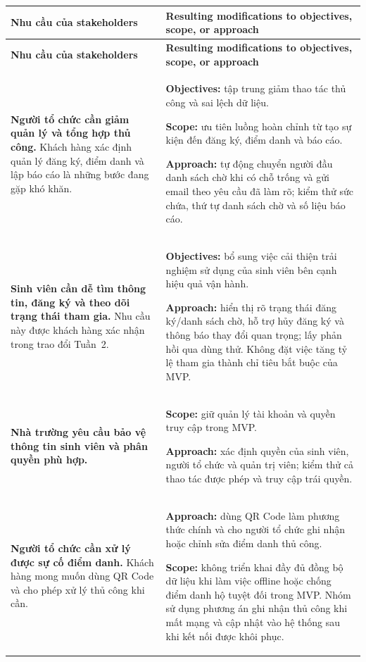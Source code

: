 \begingroup
\small
\setlength{\tabcolsep}{4pt}
\setlength{\parskip}{0pt}
\renewcommand{\arraystretch}{1.20}
\begin{longtable}{>{\RaggedRight\arraybackslash}p{}
                  >{\RaggedRight\arraybackslash}p{}}
\rowcolor{headerblue}
\color{white}\textbf{Nhu cầu của stakeholders} &
\color{white}\textbf{Resulting modifications to objectives, scope, or approach} \\
\endfirsthead

\rowcolor{headerblue}
\color{white}\textbf{Nhu cầu của stakeholders} &
\color{white}\textbf{Resulting modifications to objectives, scope, or approach} \\
\endhead

\rowcolor{lightgray}
\textbf{Người tổ chức cần giảm quản lý và tổng hợp thủ công.} Khách hàng xác định quản lý đăng ký, điểm danh và lập báo cáo là những bước đang gặp khó khăn. &
\textbf{Objectives:} tập trung giảm thao tác thủ công và sai lệch dữ liệu.
\par \textbf{Scope:} ưu tiên luồng hoàn chỉnh từ tạo sự kiện đến đăng ký, điểm danh và báo cáo.
\par \textbf{Approach:} tự động chuyển người đầu danh sách chờ khi có chỗ trống và gửi email theo yêu cầu đã làm rõ; kiểm thử sức chứa, thứ tự danh sách chờ và số liệu báo cáo. \\

\textbf{Sinh viên cần dễ tìm thông tin, đăng ký và theo dõi trạng thái tham gia.} Nhu cầu này được khách hàng xác nhận trong trao đổi Tuần~2. &
\textbf{Objectives:} bổ sung việc cải thiện trải nghiệm sử dụng của sinh viên bên cạnh hiệu quả vận hành.
\par \textbf{Approach:} hiển thị rõ trạng thái đăng ký/danh sách chờ, hỗ trợ hủy đăng ký và thông báo thay đổi quan trọng; lấy phản hồi qua dùng thử. Không đặt việc tăng tỷ lệ tham gia thành chỉ tiêu bắt buộc của MVP. \\

\rowcolor{lightgray}
\textbf{Nhà trường yêu cầu bảo vệ thông tin sinh viên và phân quyền phù hợp.} &
\textbf{Scope:} giữ quản lý tài khoản và quyền truy cập trong MVP.
\par \textbf{Approach:} xác định quyền của sinh viên, người tổ chức và quản trị viên; kiểm thử cả thao tác được phép và truy cập trái quyền. \\

\textbf{Người tổ chức cần xử lý được sự cố điểm danh.} Khách hàng mong muốn dùng QR Code và cho phép xử lý thủ công khi cần. &
\textbf{Approach:} dùng QR Code làm phương thức chính và cho người tổ chức ghi nhận hoặc chỉnh sửa điểm danh thủ công.
\par \textbf{Scope:} không triển khai đầy đủ đồng bộ dữ liệu khi làm việc offline hoặc chống điểm danh hộ tuyệt đối trong MVP. Nhóm sử dụng phương án ghi nhận thủ công khi mất mạng và cập nhật vào hệ thống sau khi kết nối được khôi phục. \\


\end{longtable}
